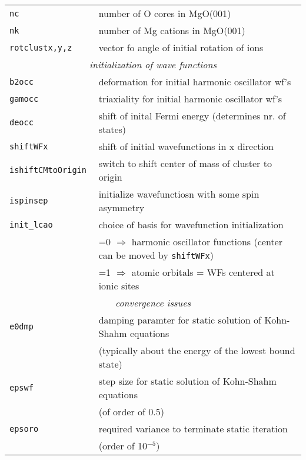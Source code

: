 \documentclass[12pt]{article}
\begin{document}
\begin{tabular}{ll}
{\tt nc               }& number of O cores in MgO(001)\\
{\tt nk               }& number of Mg cations in MgO(001)\\
{\tt rotclustx,y,z } & vector fo angle of initial rotation of ions\\
\hline
\multicolumn{2}{c}{\it initialization of wave functions} \\
\hline
{\tt b2occ            }& deformation for initial harmonic oscillator wf's\\
{\tt gamocc           }& triaxiality for initial harmonic oscillator wf's\\
{\tt deocc            }& shift of inital Fermi energy (determines nr. of
states)\\
{\tt shiftWFx         }& shift of initial wavefunctions in x direction \\
{\tt ishiftCMtoOrigin }& switch to shift center of mass of cluster to origin\\
{\tt ispinsep         }& initialize wavefunctiosn with some spin asymmetry\\
{\tt init\_lcao       }& choice of basis for wavefunction initialization \\
& =0 $\Longrightarrow$ harmonic oscillator functions (center can be
moved
  by {\tt shiftWFx})
\\
& =1 $\Longrightarrow$ atomic orbitals = WFs centered at ionic sites
\\
\hline
\multicolumn{2}{c}{\it convergence issues} \\
\hline
{\tt e0dmp            }& damping paramter for static solution of Kohn-Shahm equations\\
& (typically about the energy of the lowest bound state)\\
{\tt epswf            }& step size for static solution of Kohn-Shahm
equations\\
& (of order of 0.5)\\
{\tt epsoro           }& required variance to terminate static iteration\\
&(order of 10$^{-5}$)\\
\hline
\end{tabular}

\newpage
\end{document}

